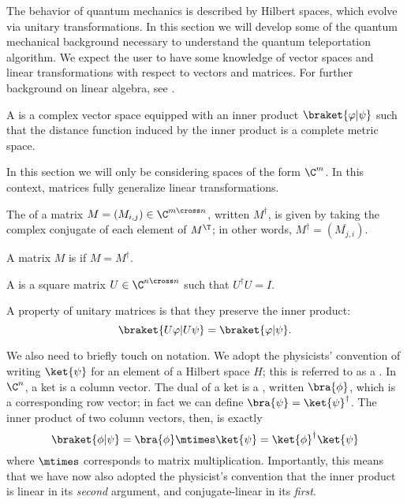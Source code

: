The behavior of quantum mechanics is described by Hilbert spaces, which
evolve via unitary transformations. In this section we will develop
some of the quantum mechanical background necessary to understand the quantum
teleportation algorithm. We expect the user to have some knowledge of vector spaces and
linear transformations with respect to vectors and matrices. For further
background on linear algebra, see \citet{gallier13}.

\begin{definition}\label{def:hilbert-space}
  A  is a complex vector space equipped with an inner product
  $\braket{\varphi | \psi}$
  such that the distance function induced by the inner product is a complete
  metric space.
\end{definition}

In this section we will only be considering spaces of the form $\C^m$.
In this context, matrices fully generalize linear transformations.

\begin{definition}\label{def:conjugate-transpose}
  The  of a matrix $M = (M_{i,j}) \in \C^{m \cross
  n}$, written $M^\dag$, is given by taking the complex conjugate of each
  element of $M^\T$; in other words, $M^\dag = (\overline{M_{j,i}})$.
\end{definition}

\begin{definition}\label{def:hermitian}
  A matrix $M$ is  if $M = M^\dag$.
\end{definition}

\begin{definition}\label{def:unitary-matrix}
  A  is a square matrix $U \in \C^{n \cross n}$ such that
  $U^\dag U = I$. 
\end{definition}
A property of unitary matrices is that they preserve the inner product:
\[
    \braket{U \varphi | U \psi} = \braket{\varphi | \psi}.
\]

We also need to briefly touch on notation.  We adopt the physicists' convention
of writing $\ket{\psi}$ for an element of a Hilbert space $H$; this is referred
to as a . In $\C^n$, a ket is a column vector.
The dual of a ket is a , written $\bra{\phi}$,
which is a corresponding row vector; in fact we can define $\bra{\psi} = \ket{\psi}^\dag$.
The inner product of two column vectors, then, is exactly
\[ \braket{\phi | \psi} = \bra{\phi} \mtimes \ket{\psi} = \ket{\phi}^\dag \ket{\psi} \]
where $\mtimes$ corresponds to matrix multiplication. Importantly, this means that we
have now also adopted the physicist's convention that the inner product is
linear in its \emph{second} argument, and conjugate-linear in its \emph{first}.

